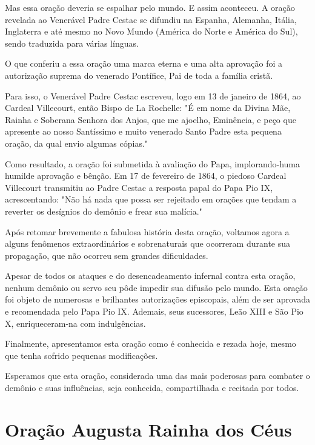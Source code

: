 \documentclass[a4paper,14pt]{extarticle} \usepackage[utf8]{inputenc}
\begin{document}
Mas essa oração deveria se espalhar pelo mundo. E assim aconteceu. A oração revelada ao Venerável Padre Cestac se difundiu na Espanha, Alemanha, Itália, Inglaterra e até mesmo no Novo Mundo (América do Norte e América do Sul), sendo traduzida para várias línguas.

O que conferiu a essa oração uma marca eterna e uma alta aprovação foi a autorização suprema do venerado Pontífice, Pai de toda a família cristã.

Para isso, o Venerável Padre Cestac escreveu, logo em 13 de janeiro de 1864, ao Cardeal Villecourt, então Bispo de La Rochelle:  
"É em nome da Divina Mãe, Rainha e Soberana Senhora dos Anjos, que me ajoelho, Eminência, e peço que apresente ao nosso Santíssimo e muito venerado Santo Padre esta pequena oração, da qual envio algumas cópias."

Como resultado, a oração foi submetida à avaliação do Papa, implorando-huma humilde aprovação e bênção.  
Em 17 de fevereiro de 1864, o piedoso Cardeal Villecourt transmitiu ao Padre Cestac a resposta papal do Papa Pio IX, acrescentando:  
"Não há nada que possa ser rejeitado em orações que tendam a reverter os desígnios do demônio e frear sua malícia."

Após retomar brevemente a fabulosa história desta oração, voltamos agora a alguns fenômenos extraordinários e sobrenaturais que ocorreram durante sua propagação, que não ocorreu sem grandes dificuldades.

Apesar de todos os ataques e do desencadeamento infernal contra esta oração, nenhum demônio ou servo seu pôde impedir sua difusão pelo mundo.  
Esta oração foi objeto de numerosas e brilhantes autorizações episcopais, além de ser aprovada e recomendada pelo Papa Pio IX.  
Ademais, seus sucessores, Leão XIII e São Pio X, enriqueceram-na com indulgências.

Finalmente, apresentamos esta oração como é conhecida e rezada hoje, mesmo que tenha sofrido pequenas modificações.

Esperamos que esta oração, considerada uma das mais poderosas para combater o demônio e suas influências, seja conhecida, compartilhada e recitada por todos.

\newpage

\section{Oração Augusta Rainha dos Céus}
\end{document}
